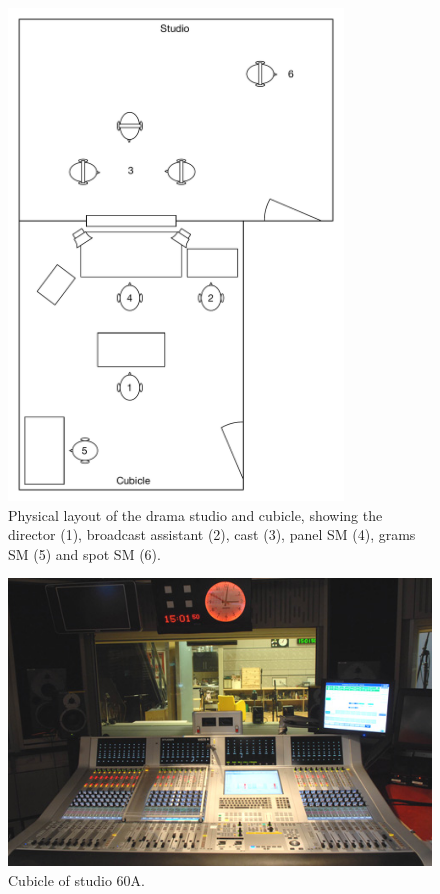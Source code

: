 \begin{figure}[p]
  \centering
  \includegraphics[width=3.5in]{figs/drama-layout.pdf}
  \caption{Physical layout of the drama studio and cubicle, showing the director (1), broadcast assistant (2), cast
  (3), panel SM (4), grams SM (5) and spot SM (6).}
  \label{fig:drama-layout}
\end{figure}

\begin{figure}[p]
  \centering
  \includegraphics[width=\columnwidth]{figs/60a.jpg}
  \caption{Cubicle of studio 60A.}
  \label{fig:drama-studio}
\end{figure}

